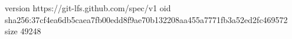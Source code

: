 version https://git-lfs.github.com/spec/v1
oid sha256:37cf4ea6db5caea7fb00edd8f9ae70b132208aa455a7771fb3a52ed2fc469572
size 49248
